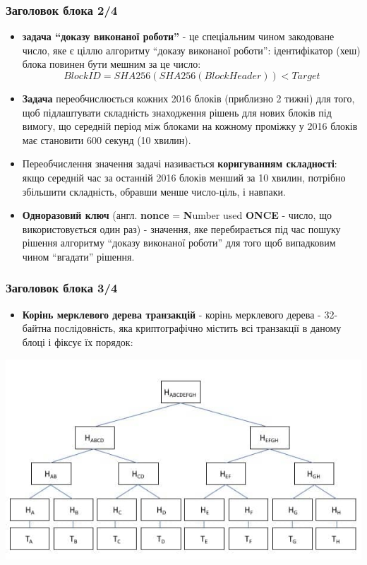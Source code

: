 \documentclass{beamer}
\begin{document}
\begin{frame}
  \frametitle{Заголовок блока 2/4}
  \begin{itemize}
  \item \textbf{задача ``доказу виконаної роботи''} - це спеціальним чином
    закодоване число, яке є ціллю алгоритму ``доказу виконаної роботи'':
    ідентифікатор (хеш) блока повинен бути мешним за це число:
    $$ BlockID = SHA256(SHA256(BlockHeader)) < Target$$
  \item \textbf{Задача} переобчислюється кожних 2016 блоків (приблизно 2 тижні)
    для того, щоб підлаштувати складність знаходження рішень для нових блоків
    під вимогу, що середній період між блоками на кожному проміжку у 2016 блоків
    має становити 600 секунд (10 хвилин).
  \item Переобчислення значення задачі називається \textbf{коригуванням
      складності}: якщо середній час за останній 2016 блоків менший за 10
    хвилин, потрібно збільшити складність, обравши менше число-ціль, і навпаки.
  \item \textbf{Одноразовий ключ} (англ. \textbf{nonce} = \textbf{N}umber used
    \textbf{ONCE} - число, що використовується один раз) - значення, яке
    перебирається під час пошуку рішення алгоритму ``доказу виконаної роботи''
    для того щоб випадковим чином ``вгадати'' рішення.
  \end{itemize}
\end{frame}

\begin{frame}
  \frametitle{Заголовок блока 3/4}
  \begin{itemize}
  \item \textbf{Корінь мерклевого дерева транзакцій} - корінь мерклевого дерева
    - 32-байтна послідовність, яка криптографічно містить всі транзакції в
    даному блоці і фіксує їх порядок:
  \end{itemize}
  \includegraphics[width=\textwidth]{merkletree}
\end{frame}
\end{document}
